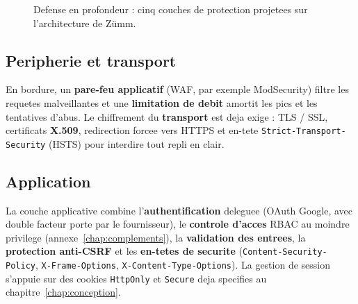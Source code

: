 \begin{figure}[htbp]
\centering
{}
\caption{Defense en profondeur : cinq couches de protection projetees sur
l'architecture de Z\"umm.}
\label{fig:secu-couches}
\end{figure}

\subsection{Peripherie et transport}
En bordure, un \textbf{pare-feu applicatif} (WAF, par exemple ModSecurity) filtre
les requetes malveillantes et une \textbf{limitation de debit} amortit les pics
et les tentatives d'abus. Le chiffrement du \textbf{transport} est deja exige :
TLS / SSL, certificats \textbf{X.509}, redirection forcee vers HTTPS et en-tete
\texttt{Strict-Transport-Security} (HSTS) pour interdire tout repli en clair.

\subsection{Application}
La couche applicative combine l'\textbf{authentification} deleguee (OAuth Google,
avec double facteur porte par le fournisseur), le \textbf{controle d'acces} RBAC
au moindre privilege (annexe~\ref{chap:complements}), la \textbf{validation des
entrees}, la \textbf{protection anti-CSRF} et les \textbf{en-tetes de securite}
(\texttt{Content-Security-Policy}, \texttt{X-Frame-Options},
\texttt{X-Content-Type-Options}). La gestion de session s'appuie sur des cookies
\texttt{HttpOnly} et \texttt{Secure} deja specifies au chapitre~\ref{chap:conception}.

